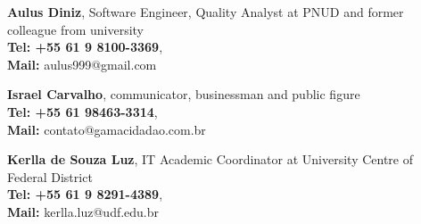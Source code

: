 
\textbf{Aulus Diniz}, Software Engineer, Quality Analyst at PNUD and former colleague from university \\ 
\textbf{Tel: +55 61 9 8100-3369}, \\
\textbf{Mail:} aulus999@gmail.com

\divider

\textbf{Israel Carvalho}, communicator, businessman and public figure \\ 
\textbf{Tel: +55 61 98463-3314}, \\
\textbf{Mail:} contato@gamacidadao.com.br

\divider

\textbf{Kerlla de Souza Luz}, IT Academic Coordinator at University Centre of Federal District \\ 
\textbf{Tel: +55 61 9 8291-4389}, \\
\textbf{Mail:} kerlla.luz@udf.edu.br